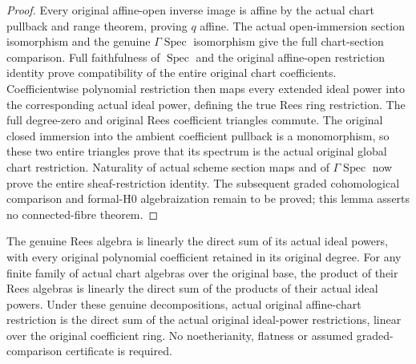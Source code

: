 \begin{proof}
Every original affine-open inverse image is affine by the actual chart pullback and
range theorem, proving $q$ affine. The actual open-immersion section isomorphism and
the genuine $\Gamma\operatorname{Spec}$ isomorphism give the full chart-section
comparison. Full faithfulness of $\operatorname{Spec}$ and the original affine-open
restriction identity prove compatibility of the entire original chart coefficients.
Coefficientwise polynomial restriction then maps every extended ideal power into
the corresponding actual ideal power, defining the true Rees ring restriction.
The full degree-zero and original Rees coefficient triangles commute. The original
closed immersion into the ambient coefficient pullback is a monomorphism, so these
two entire triangles prove that its spectrum is the actual original global chart
restriction. Naturality of actual scheme section maps and of
$\Gamma\operatorname{Spec}$ now prove the entire sheaf-restriction identity.
The subsequent graded cohomological comparison and formal-H0 algebraization remain
to be proved; this lemma asserts no connected-fibre theorem.
\end{proof}

\begin{lemma}\label{lem:fc-rees-power-decomposition}
\leanok
{}
The genuine Rees algebra is linearly the direct sum of its actual ideal powers,
with every original polynomial coefficient retained in its original degree.
For any finite family of actual chart algebras over the original base, the product
of their Rees algebras is linearly the direct sum of the products of their actual
ideal powers. Under these genuine decompositions, actual original affine-chart
restriction is the direct sum of the actual original ideal-power restrictions,
linear over the original coefficient ring. No noetherianity, flatness or assumed
graded-comparison certificate is required.
\end{lemma}


